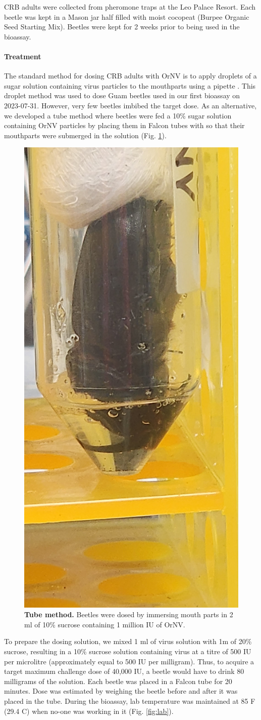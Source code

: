 \documentclass[12pt,letterpaper,english,bibliography=totocnumbered, abstract=on]{scrartcl}
\begin{document}
CRB adults were collected from pheromone traps at the Leo Palace Resort. Each beetle was kept in a Mason jar half filled with moist cocopeat (Burpee Organic Seed Starting Mix). Beetles were kept for 2 weeks prior to being used in the bioassay.

\paragraph{Treatment}

The standard method for dosing CRB adults with OrNV is to apply droplets of a sugar solution containing virus particles to the mouthparts using a pipette \cite{AgResearch2023-OrNV-prep2023,AgResearch2023-OrNV-minitest}. This droplet method was used to dose Guam beetles used in our first bioassay on 2023-07-31. However, very few beetles imbibed the target dose. As an alternative, we developed a tube method \cite{tube-dosing-method} where beetles were fed a 10\% sugar solution containing OrNV particles by placing them in Falcon tubes with so that their mouthparts were submerged in the solution (Fig. \ref*{fig:tubemethod}).

\begin{figure}[H]
	\centering
	\caption{\textbf{Tube method.} Beetles were dosed by immersing mouth parts in 2 ml of 10\% sucrose containing 1 million IU of OrNV.}
	\label{fig:tubemethod}
	\includegraphics[angle=-90,origin=c,width=0.15\linewidth]{images/tube_method}
\end{figure} 

To prepare the dosing solution, we mixed 1 ml of virus solution with 1m of 20\% sucrose, resulting in a 10\% sucrose solution containing virus at a titre of 500 IU per microlitre (approximately equal to 500 IU per milligram). Thus, to acquire a target maximum challenge dose of 40,000 IU, a beetle would have to drink 80 milligrams of the solution. Each beetle was placed in a Falcon tube for 20 minutes. Dose was estimated by weighing the beetle before and after it was placed in the tube. During the bioassay, lab temperature was maintained at 85 \degree F (29.4 \degree C) when no-one was working in it (Fig. \ref{fig:lab}). 
\end{document}
